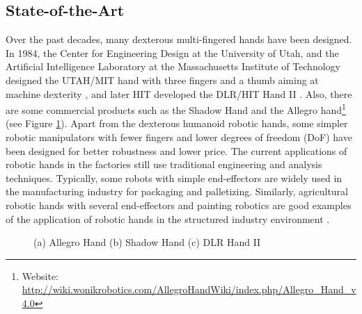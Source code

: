 \documentclass[a4paper]{article}
\begin{document}
\subsection{State-of-the-Art}
Over the past decades, many dexterous multi-fingered hands have been designed. In 1984, the Center for Engineering Design at the University of Utah, and the Artificial Intelligence Laboratory at the Massachusetts Institute of Technology designed the UTAH/MIT hand with three fingers and a thumb aiming at machine dexterity \cite{JacobsenIKJB86}, and later HIT developed the DLR/HIT Hand II \cite{Liu2008MultisensoryFD}. Also, there are some commercial products such as the Shadow Hand \cite{article} and the Allegro hand\footnote{Website: \url{http://wiki.wonikrobotics.com/AllegroHandWiki/index.php/Allegro_Hand_v4.0}} (see Figure \ref{fig:foobar}).
Apart from the dexterous humanoid robotic hands, some simpler robotic manipulators with fewer fingers and lower degrees of freedom (DoF) have been designed for better robustness and lower price. The current applications of robotic hands in the factories still use traditional engineering and analysis techniques. Typically, some robots with simple end-effectors are widely used in the manufacturing industry for packaging and palletizing. Similarly, agricultural robotic hands with several end-effectors and painting robotics are good examples of the application of robotic hands in the structured industry environment \cite{10.3389/fnbot.2022.861825}.

\begin{figure}[!hb]
    \centering
    \caption{(a) Allegro Hand (b) Shadow Hand (c) DLR Hand II }
    \label{fig:foobar}
\end{figure}
\end{document}
